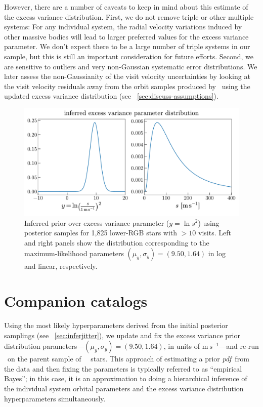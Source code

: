 \documentclass[modern, letterpaper]{aastex62}
\newcommand{\apogee}{\project{\acronym{APOGEE}}}
\newcommand{\thejoker}{\project{The~Joker}}
\newcommand{\DR}{\acronym{DR14}}
\newcommand{\pdf}{\textit{pdf}}
\begin{document}
However, there are a number of caveats to keep in mind about this estimate of
the excess variance distribution.
First, we do not remove triple or other multiple systems: For any individual
system, the radial velocity variations induced by other massive bodies will lead
to larger preferred values for the excess variance parameter.
We don't expect there to be a large number of triple systems in our sample, but
this is still an important consideration for future efforts.
Second, we are sensitive to outliers and very non-Gaussian systematic error
distributions.
We later assess the non-Gaussianity of the visit velocity uncertainties by
looking at the visit velocity residuals away from the orbit samples produced by
\thejoker\ using the updated excess variance distribution (see
\sectionname~\ref{sec:discuss-assumptions}).

\begin{figure}[h]
\begin{center}
\includegraphics[width=\textwidth]{infer-jitter}
\end{center}
\caption{%
Inferred prior over excess variance parameter ($y = \ln s^2$) using posterior
samples for 1,825 lower-RGB stars with $>10$ visits.
Left and right panels show the distribution corresponding to the
maximum-likelihood parameters $(\mu_y, \sigma_y) = (9.50, 1.64)$ in log and
linear, respectively.
\label{fig:infer-jitter}
}
\end{figure}


\section{Companion catalogs}
\label{sec:catalogs}

Using the most likely hyperparameters derived from the initial posterior
samplings (see \sectionname~\ref{sec:inferjitter}), we update and fix the
excess variance prior distribution parameters---$(\mu_{y}, \sigma_{y}) = (9.50,
1.64)$, in units of $\textrm{m}~\textrm{s}^{-1}$---and re-run \thejoker\ on the
parent sample of \apogee\ \DR\ stars.
This approach of estimating a prior \pdf\ from the data and then fixing the
parameters is typically referred to as ``empirical Bayes''; in this case, it is
an approximation to doing a hierarchical inference of the individual system
orbital parameters and the excess variance distribution hyperparameters
simultaneously.
\end{document}
